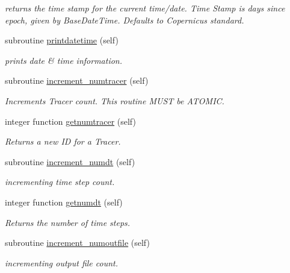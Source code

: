 \begin{DoxyCompactItemize}
\begin{DoxyCompactList}\small\item\em returns the time stamp for the current time/date. Time Stamp is days since epoch, given by Base\+Date\+Time. Defaults to Copernicus standard. \end{DoxyCompactList}\item 
subroutine \mbox{\hyperlink{namespacesimulationglobals__mod_abd0e28a5ec7733d0292dd8e631e96577}{printdatetime}} (self)
\begin{DoxyCompactList}\small\item\em prints date \& time information. \end{DoxyCompactList}\item 
subroutine \mbox{\hyperlink{namespacesimulationglobals__mod_a3f11ed9f7735018950e1921ead871269}{increment\+\_\+numtracer}} (self)
\begin{DoxyCompactList}\small\item\em Increments Tracer count. This routine M\+U\+ST be A\+T\+O\+M\+IC. \end{DoxyCompactList}\item 
integer function \mbox{\hyperlink{namespacesimulationglobals__mod_ac4915156236196940b31ff02d53af295}{getnumtracer}} (self)
\begin{DoxyCompactList}\small\item\em Returns a new ID for a Tracer. \end{DoxyCompactList}\item 
subroutine \mbox{\hyperlink{namespacesimulationglobals__mod_ad983ee8885b275c6fa1369f1e158e078}{increment\+\_\+numdt}} (self)
\begin{DoxyCompactList}\small\item\em incrementing time step count. \end{DoxyCompactList}\item 
integer function \mbox{\hyperlink{namespacesimulationglobals__mod_af313959d6cbfc4cb0ab330aa094511c5}{getnumdt}} (self)
\begin{DoxyCompactList}\small\item\em Returns the number of time steps. \end{DoxyCompactList}\item 
subroutine \mbox{\hyperlink{namespacesimulationglobals__mod_a77d7175bc03e472ee9a00ee9f6ff1b0e}{increment\+\_\+numoutfile}} (self)
\begin{DoxyCompactList}\small\item\em incrementing output file count. \end{DoxyCompactList}\item 

\end{DoxyCompactItemize}
